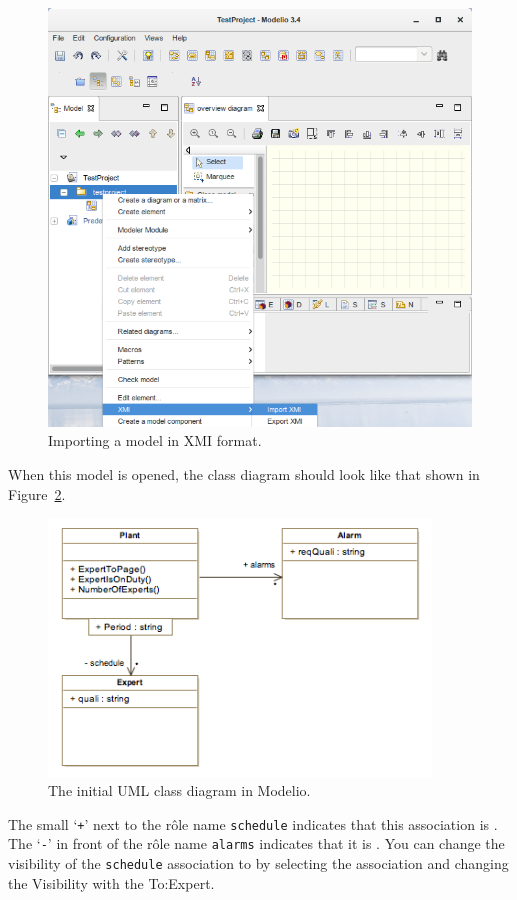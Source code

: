 \begin{figure}[htbp]
\begin{center}
\includegraphics[width=5in]{figures/importxmi.png}
\caption{Importing a model in XMI format.}
\label{fig:importxmi}
\end{center}
\end{figure}
%
When this model is opened, the class diagram should look like that shown in Figure~\ref{fig:initialumlmodelio}.
%
\begin{figure}[htbp]
\begin{center}
\includegraphics[width=4in]{figures/initialumlmodelio}
\caption{The initial UML class diagram in Modelio.\label{fig:initialumlmodelio}}
\end{center}
\end{figure}
%
The small `\texttt{+}' next to the r\^{o}le name \texttt{schedule} indicates that this association is . The `\texttt{-}' in front of the r\^{o}le name \texttt{alarms} indicates that it is . You can change the visibility of the \texttt{schedule} association to  by selecting the association and changing the \textsf{Visibility} with the \textsf{To:Expert}.

